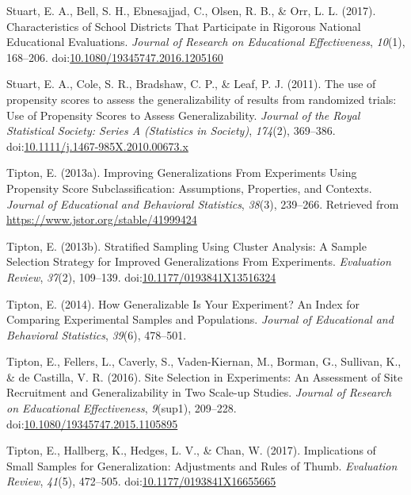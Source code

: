 \documentclass[man,floatsintext]{apa6}
\begin{document}
\leavevmode\hypertarget{ref-stuartCharacteristicsSchoolDistricts2017}{}%
Stuart, E. A., Bell, S. H., Ebnesajjad, C., Olsen, R. B., \& Orr, L. L. (2017). Characteristics of School Districts That Participate in Rigorous National Educational Evaluations. \emph{Journal of Research on Educational Effectiveness}, \emph{10}(1), 168--206. doi:\href{https://doi.org/10.1080/19345747.2016.1205160}{10.1080/19345747.2016.1205160}

\leavevmode\hypertarget{ref-stuartUsePropensityScores2011}{}%
Stuart, E. A., Cole, S. R., Bradshaw, C. P., \& Leaf, P. J. (2011). The use of propensity scores to assess the generalizability of results from randomized trials: Use of Propensity Scores to Assess Generalizability. \emph{Journal of the Royal Statistical Society: Series A (Statistics in Society)}, \emph{174}(2), 369--386. doi:\href{https://doi.org/10.1111/j.1467-985X.2010.00673.x}{10.1111/j.1467-985X.2010.00673.x}

\leavevmode\hypertarget{ref-tiptonImprovingGeneralizationsExperiments2013}{}%
Tipton, E. (2013a). Improving Generalizations From Experiments Using Propensity Score Subclassification: Assumptions, Properties, and Contexts. \emph{Journal of Educational and Behavioral Statistics}, \emph{38}(3), 239--266. Retrieved from \url{https://www.jstor.org/stable/41999424}

\leavevmode\hypertarget{ref-tiptonStratifiedSamplingUsing2013}{}%
Tipton, E. (2013b). Stratified Sampling Using Cluster Analysis: A Sample Selection Strategy for Improved Generalizations From Experiments. \emph{Evaluation Review}, \emph{37}(2), 109--139. doi:\href{https://doi.org/10.1177/0193841X13516324}{10.1177/0193841X13516324}

\leavevmode\hypertarget{ref-tiptonHowGeneralizableYour2014}{}%
Tipton, E. (2014). How Generalizable Is Your Experiment? An Index for Comparing Experimental Samples and Populations. \emph{Journal of Educational and Behavioral Statistics}, \emph{39}(6), 478--501.

\leavevmode\hypertarget{ref-tiptonSiteSelectionExperiments2016}{}%
Tipton, E., Fellers, L., Caverly, S., Vaden-Kiernan, M., Borman, G., Sullivan, K., \& de Castilla, V. R. (2016). Site Selection in Experiments: An Assessment of Site Recruitment and Generalizability in Two Scale-up Studies. \emph{Journal of Research on Educational Effectiveness}, \emph{9}(sup1), 209--228. doi:\href{https://doi.org/10.1080/19345747.2015.1105895}{10.1080/19345747.2015.1105895}

\leavevmode\hypertarget{ref-tiptonImplicationsSmallSamples2017}{}%
Tipton, E., Hallberg, K., Hedges, L. V., \& Chan, W. (2017). Implications of Small Samples for Generalization: Adjustments and Rules of Thumb. \emph{Evaluation Review}, \emph{41}(5), 472--505. doi:\href{https://doi.org/10.1177/0193841X16655665}{10.1177/0193841X16655665}

\endgroup
\end{document}
